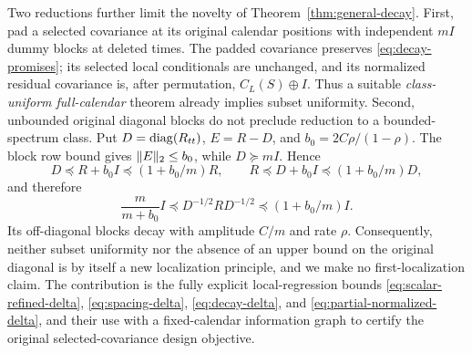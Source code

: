 Two reductions further limit the novelty of
Theorem~\ref{thm:general-decay}. First, pad a selected covariance at its
original calendar positions with independent $mI$ dummy blocks at deleted
times. The padded covariance preserves \eqref{eq:decay-promises}; its
selected local conditionals are unchanged, and its normalized residual
covariance is, after permutation, $C_L(S)\oplus I$. Thus a suitable
\emph{class-uniform full-calendar} theorem already implies subset uniformity.
Second, unbounded original diagonal blocks do not preclude reduction to a
bounded-spectrum class. Put $D=\operatorname{diag}(R_{tt})$, $E=R-D$, and
$b_0=2C\rho/(1-\rho)$. The block row bound gives $\lVert E\rVert_2\le b_0$,
while $D\succeq mI$. Hence
\[
 D\preceq R+b_0I\preceq(1+b_0/m)R,
 \qquad R\preceq D+b_0I\preceq(1+b_0/m)D,
\]
and therefore
\begin{equation}
 \frac{m}{m+b_0}I\preceq D^{-1/2}RD^{-1/2}
            \preceq(1+b_0/m)I.
 \label{eq:diagonal-priority-reduction}
\end{equation}
Its off-diagonal blocks decay with amplitude $C/m$ and rate $\rho$.
Consequently, neither subset uniformity nor the absence of an upper bound on
the original diagonal is by itself a new localization principle, and we make
no first-localization claim. The contribution is the fully explicit
local-regression bounds \eqref{eq:scalar-refined-delta},
\eqref{eq:spacing-delta}, \eqref{eq:decay-delta}, and
\eqref{eq:partial-normalized-delta}, and their use with a fixed-calendar
information graph to certify the original selected-covariance design
objective.
